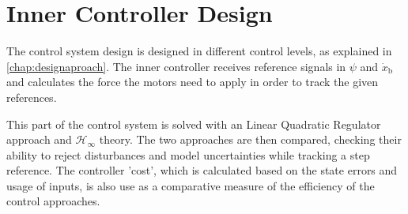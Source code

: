 \chapter{Inner Controller Design}\label{chap:innercontrol}

The control system design is designed in different control levels, as explained in \autoref{chap:designaproach}. The inner controller receives reference signals in $\psi$ and $\dot{x}_\mathrm{b}$ and calculates the force the motors need to apply in order to track the given references. 

This part of the control system is solved with an Linear Quadratic Regulator approach and $\mathcal{H}_\infty$ theory. The two approaches are then compared, checking their ability to reject disturbances and model uncertainties while tracking a step reference. The controller 'cost', which is calculated based on the state errors and usage of inputs, is also use as a comparative measure of the efficiency of the control approaches.



